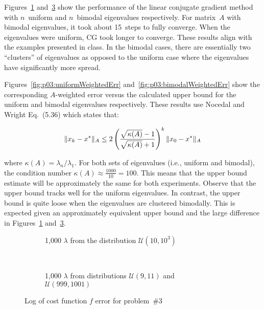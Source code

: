 Figures~\ref{fig:p03:uniformEigenvalues} and~\ref{fig:p03:bimodalEigenvalues} show the performance of the linear conjugate gradient method with $n$~uniform and $n$~bimodal eigenvalues respectively.  For matrix~$A$ with bimodal eigenvalues, it took about 15~steps to fully converge.  When the eigenvalues were uniform, CG took longer to converge.  These results align with the examples presented in class.  In the bimodal cases, there are essentially two ``clusters'' of eigenvalues as opposed to the uniform case where the eigenvalues have significantly more spread.

Figures~\ref{fig:p03:uniformWeightedErr} and~\ref{fig:p03:bimodalWeightedErr} show the corresponding $A$-weighted error versus the calculated upper bound for the uniform and bimodal eigenvalues respectively.  These results use Nocedal and Wright Eq.~(5.36) which states that:

\[ \lVert x_k - x^{*}\rVert_{A} \leq 2\left(\frac{\sqrt{\kappa(A)}-1}{\sqrt{\kappa(A)}+1}\right)^{k}\lVert x_0 - x^{*}\rVert_{A} \]

\noindent
where $\kappa(A)=\lambda_n / \lambda_1$. For both sets of eigenvalues (i.e., uniform and bimodal), the condition number ${\kappa(A) \approx \frac{1000}{10} = 100}$.  This means that the upper bound estimate will be approximately the same for both experiments.  Observe that the upper bound tracks well for the uniform eigenvalues.  In contrast, the upper bound is quite loose when the eigenvalues are clustered bimodally.  This is expected given an approximately equivalent upper bound and the large difference in Figures~\ref{fig:p03:uniformEigenvalues} and~\ref{fig:p03:bimodalEigenvalues}.

\newpage
\begin{figure}[p]
  \centering
  \begin{subfigure}[t]{0.45\textwidth}
    \centering
    
    \caption{\scriptsize 1,000 $\lambda$ from the distribution $\mathcal{U}(10,10^{3})$}\label{fig:p03:uniformEigenvalues}
  \end{subfigure}
  ~
  \begin{subfigure}[t]{0.45\textwidth}
    \centering
    
    \caption{\scriptsize 1,000 $\lambda$ from distributions $\mathcal{U}(9,11)$ and $\mathcal{U}(999,1001)$ }\label{fig:p03:bimodalEigenvalues}
  \end{subfigure}
  \caption{Log of cost function $f$ error for problem~\#3}
\end{figure}

